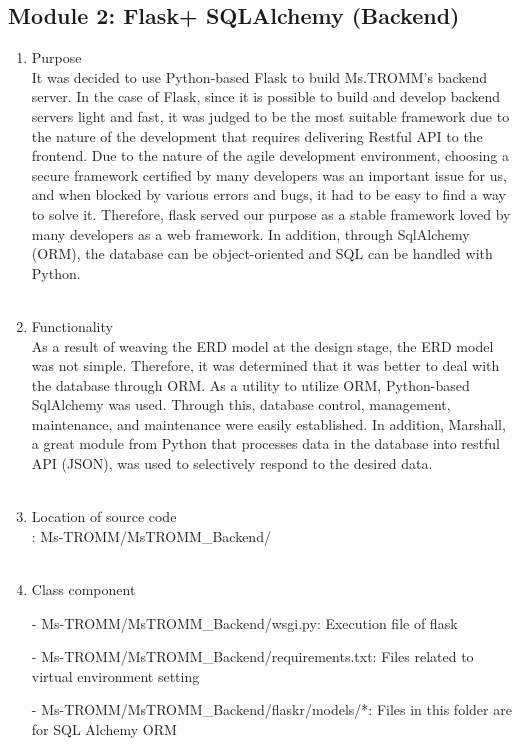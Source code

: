 \documentclass[conference]{IEEEtran}
\begin{document}
\subsection{Module 2: Flask+ SQLAlchemy (Backend)}
\begin{enumerate}
    \item Purpose\\
    It was decided to use Python-based Flask to build Ms.TROMM's backend server. In the case of Flask, since it is possible to build and develop backend servers light and fast, it was judged to be the most suitable framework due to the nature of the development that requires delivering Restful API to the frontend. Due to the nature of the agile development environment, choosing a secure framework certified by many developers was an important issue for us, and when blocked by various errors and bugs, it had to be easy to find a way to solve it. Therefore, flask served our purpose as a stable framework loved by many developers as a web framework. In addition, through SqlAlchemy (ORM), the database can be object-oriented and SQL can be handled with Python.\\ \\
    \item Functionality\\
    As a result of weaving the ERD model at the design stage, the ERD model was not simple. Therefore, it was determined that it was better to deal with the database through ORM. As a utility to utilize ORM, Python-based SqlAlchemy was used. Through this, database control, management, maintenance, and maintenance were easily established. In addition, Marshall, a great module from Python that processes data in the database into restful API (JSON), was used to selectively respond to the desired data.\\ \\
    \item Location of source code\\: Ms-TROMM/MsTROMM\_Backend/ \\ \\
    \item Class component 
        \item[-] Ms-TROMM/MsTROMM\_Backend/wsgi.py: Execution file of flask \\
        \item[-] Ms-TROMM/MsTROMM\_Backend/requirements.txt: Files related to virtual environment setting \\
        \item[-] Ms-TROMM/MsTROMM\_Backend/flaskr/models/*: Files in this folder are for SQL Alchemy ORM \\ \\

\end{enumerate}
\end{document}
